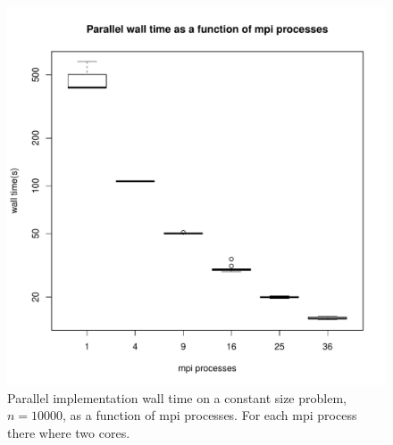 \documentclass{article}
\begin{document}
\begin{figure}[H]
  \begin{center}
    \includegraphics[width=12cm]{../analysis/mpi_nodes_walltime_mkl.pdf}
  \end{center}
  \caption{Parallel implementation wall time on a constant size problem, $n=10000$, as a function of mpi processes. For each mpi process there where two cores.}
  \label{parallel_walltime2}
\end{figure}
\end{document}
